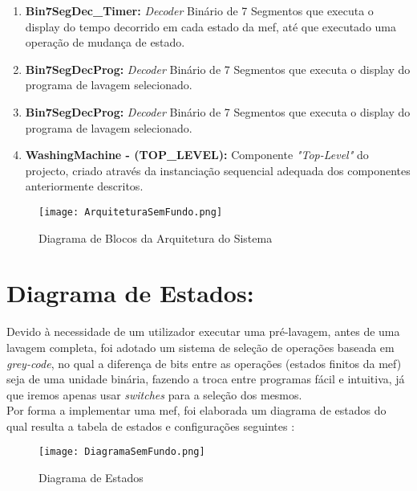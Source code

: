 \begin{enumerate}
		\item\textbf{Bin7SegDec\_Timer:} \textit{Decoder} Binário de 7 Segmentos que executa o display do tempo decorrido em cada estado da \ac{mef}, até que executado uma operação de mudança de estado.

		\item\textbf{Bin7SegDecProg:} \textit{Decoder} Binário de 7 Segmentos que executa o display do programa de lavagem selecionado.

		\item\textbf{Bin7SegDecProg:} \textit{Decoder} Binário de 7 Segmentos que executa o display do programa de lavagem selecionado.
		
		\item\textbf{WashingMachine - (TOP\_LEVEL):} Componente \textit{"Top-Level"} do projecto, criado através da instanciação sequencial adequada dos componentes anteriormente descritos.
		
	\end{enumerate}


\begin{figure}[H]
	\centering
	\texttt{[image: ArquiteturaSemFundo.png]}
	\caption{Diagrama de Blocos da Arquitetura do Sistema\\}
	\label{fig:diag_blocos}
\end{figure} 


\newpage
\section{Diagrama de Estados:}
\label{sec.diag_estados}


Devido à necessidade de um utilizador executar uma pré-lavagem, antes de uma lavagem completa, foi adotado um sistema de seleção de operações baseada em \textit{grey-code}, no qual a diferença de bits entre as operações (estados finitos da \ac{mef}) seja de uma unidade binária, fazendo a troca entre programas fácil e intuitiva, já que iremos apenas usar \textit{switches} para a seleção dos mesmos. \\
Por forma a implementar uma \acf{mef}, foi elaborada um diagrama de estados do qual resulta a tabela de estados e configurações seguintes : 


\begin{figure}[H]
	\centering
	\texttt{[image: DiagramaSemFundo.png]}
	\caption{Diagrama de Estados \\}
	\label{fig:diag_blocos_bdf}
\end{figure} 

